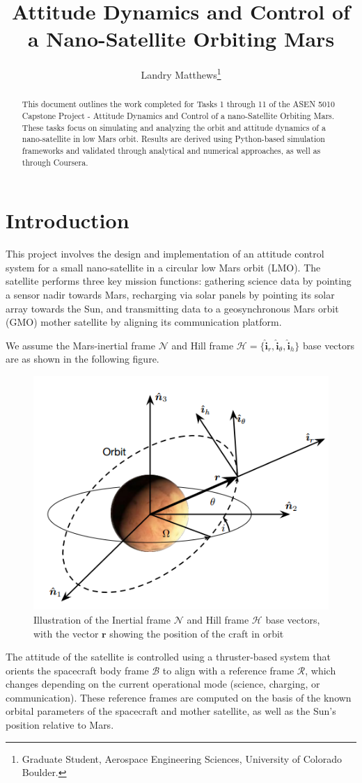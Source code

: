 \documentclass[conf]{new-aiaa}
\title{Attitude Dynamics and Control of a Nano-Satellite Orbiting Mars}
\author{Landry Matthews\footnote{Graduate Student, Aerospace Engineering Sciences, University of Colorado Boulder.}}
\affil{University of Colorado Boulder, Boulder, CO, 80309}
\begin{document}
\maketitle

\begin{abstract}
This document outlines the work completed for Tasks 1 through 11 of the ASEN 5010 Capstone Project - Attitude Dynamics and Control of a nano-Satellite Orbiting Mars. These tasks focus on simulating and analyzing the orbit and attitude dynamics of a nano-satellite in low Mars orbit. Results are derived using Python-based simulation frameworks and validated through analytical and numerical approaches, as well as through Coursera.
\end{abstract}

\section*{Introduction}
This project involves the design and implementation of an attitude control system for a small nano-satellite in a circular low Mars orbit (LMO). The satellite performs three key mission functions: gathering science data by pointing a sensor nadir towards Mars, recharging via solar panels by pointing its solar array towards the Sun, and transmitting data to a geosynchronous Mars orbit (GMO) mother satellite by aligning its communication platform.

We assume the Mars-inertial frame $\mathcal{N}$ and Hill frame $\mathcal{H} = \{\hat{\bm{i}}_r, \hat{\bm{i}}_{\theta}, \hat{\bm{i}}_h\}$ base vectors are as shown in the following figure.\begin{figure}[H]
    \centering
    \captionsetup{width=.7\linewidth}
    \includegraphics[width=.75\linewidth]{fig1.png}
    \caption{Illustration of the Inertial frame $\mathcal{N}$ and Hill frame $\mathcal{H}$ base vectors, with the vector $\bm r$ showing the position of the craft in orbit}
    \label{fig:enter-label}
\end{figure}
The attitude of the satellite is controlled using a thruster-based system that orients the spacecraft body frame $\mathcal{B}$ to align with a reference frame $\mathcal{R}$, which changes depending on the current operational mode (science, charging, or communication). These reference frames are computed on the basis of the known orbital parameters of the spacecraft and mother satellite, as well as the Sun's position relative to Mars.
\end{document}
